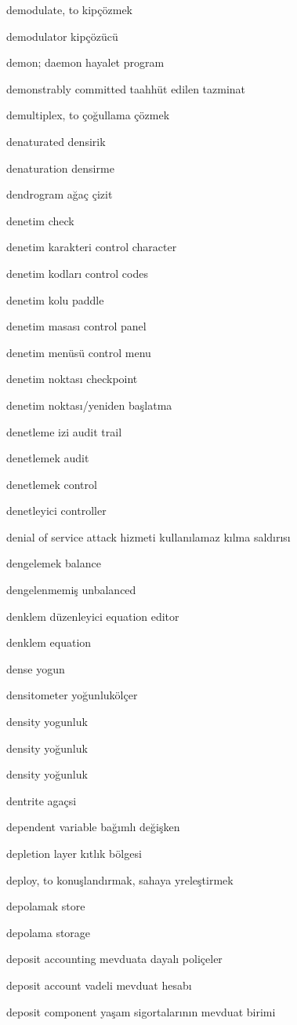\documentclass[12pt,fleqn]{article}\usepackage{../../common}
\begin{document}
demodulate, to kipçözmek

demodulator kipçözücü

demon; daemon hayalet program

demonstrably committed taahhüt edilen tazminat

demultiplex, to çoğullama çözmek

denaturated densirik

denaturation densirme

dendrogram ağaç çizit

denetim check

denetim karakteri control character

denetim kodları control codes

denetim kolu paddle

denetim masası control panel

denetim menüsü control menu

denetim noktası checkpoint

denetim noktası/yeniden başlatma

denetleme izi audit trail

denetlemek audit

denetlemek control

denetleyici controller

denial of service attack hizmeti kullanılamaz kılma saldırısı

dengelemek balance

dengelenmemiş unbalanced

denklem düzenleyici equation editor

denklem equation

dense yogun

densitometer yoğunlukölçer

density yogunluk

density yoğunluk

density yoğunluk

dentrite agaçsi

dependent variable bağımlı değişken

depletion layer kıtlık bölgesi

deploy, to konuşlandırmak, sahaya yreleştirmek

depolamak store

depolama storage

deposit accounting mevduata dayalı poliçeler

deposit account vadeli mevduat hesabı

deposit component yaşam sigortalarının mevduat birimi
\end{document}

